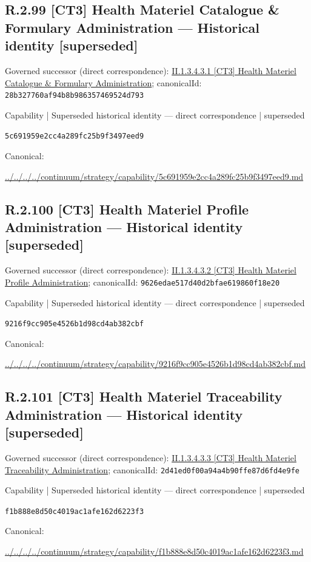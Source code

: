 \documentclass[10pt,a4paper]{article}
\begin{document}
\subsection*{R.2.99 [CT3] Health Materiel Catalogue \& Formulary Administration — Historical identity [superseded]}
Governed successor (direct correspondence): \hyperref[element-28b327760af94b8b986357469524d793]{II.1.3.4.3.1 [CT3] Health Materiel Catalogue \& Formulary Administration}; canonicalId: \texttt{28b327760af94b8b986357469524d793}\par
\label{element-5c691959e2cc4a289fc25b9f3497eed9}
{\small Capability | Superseded historical identity — direct correspondence | superseded}\par
\texttt{5c691959e2cc4a289fc25b9f3497eed9}\par
Canonical: \par
{\footnotesize\url{../../../../continuum/strategy/capability/5c691959e2cc4a289fc25b9f3497eed9.md}}\par
\subsection*{R.2.100 [CT3] Health Materiel Profile Administration — Historical identity [superseded]}
Governed successor (direct correspondence): \hyperref[element-9626edae517d40d2bfae619860f18e20]{II.1.3.4.3.2 [CT3] Health Materiel Profile Administration}; canonicalId: \texttt{9626edae517d40d2bfae619860f18e20}\par
\label{element-9216f9cc905e4526b1d98cd4ab382cbf}
{\small Capability | Superseded historical identity — direct correspondence | superseded}\par
\texttt{9216f9cc905e4526b1d98cd4ab382cbf}\par
Canonical: \par
{\footnotesize\url{../../../../continuum/strategy/capability/9216f9cc905e4526b1d98cd4ab382cbf.md}}\par
\subsection*{R.2.101 [CT3] Health Materiel Traceability Administration — Historical identity [superseded]}
Governed successor (direct correspondence): \hyperref[element-2d41ed0f00a94a4b90ffe87d6fd4e9fe]{II.1.3.4.3.3 [CT3] Health Materiel Traceability Administration}; canonicalId: \texttt{2d41ed0f00a94a4b90ffe87d6fd4e9fe}\par
\label{element-f1b888e8d50c4019ac1afe162d6223f3}
{\small Capability | Superseded historical identity — direct correspondence | superseded}\par
\texttt{f1b888e8d50c4019ac1afe162d6223f3}\par
Canonical: \par
{\footnotesize\url{../../../../continuum/strategy/capability/f1b888e8d50c4019ac1afe162d6223f3.md}}\par
\end{document}
